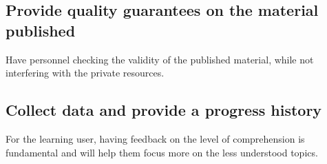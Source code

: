 \subsection{Provide quality guarantees on the material published}

Have personnel checking the validity of the published material, while not interfering with the private resources.

\subsection{Collect data and provide a progress history}

For the learning user, having feedback on the level of comprehension is fundamental and will help them focus more on the less understood topics.